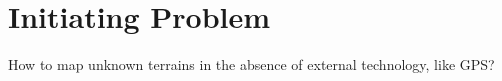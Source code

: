 \section{Initiating Problem}
How to map unknown terrains in the absence of external technology, like GPS?